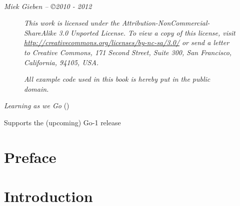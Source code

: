 \documentclass[a4paper,twoside,openleft]{blocksbook}
\begin{document}
\vfill
\begin{center}
    \hspace*{1cm}\\[2.5ex]
    \hspace*{1cm}{\tiny\CcNote{\CcLongnameByNcSa}}
\end{center}
\begin{center}
\hspace*{1cm}\emph{Miek Gieben -- \copyright 2010 - 2012}
\end{center}
\vspace{-3em}

\newpage

\thispagestyle{empty}
\begin{figure}[H]
\begin{center}
\emph{
This work is licensed under the Attribution-NonCommercial-ShareAlike 3.0 Unported License. To
view a copy of this license, visit \url{http://creativecommons.org/licenses/by-nc-sa/3.0/} 
or send a letter
to Creative Commons, 171 Second Street, Suite 300, San Francisco, California, 94105, USA.}
\vspace{2em}

\emph{All example code used in this book is hereby put in the public domain.}
\end{center}
\end{figure}
\begin{center}
\vfill
\emph{Learning as we Go}
(\emph{\version})

\tiny{Supports the (upcoming) Go-1 release}
\vspace{.2\stockheight}
\end{center}

\clearpage

\tableofcontents*
\listoffigures*
\listofcode* 
\listofex* 
\clearpage

\chapter*{Preface}
\label{chap:preface}


\chapter{Introduction}
\label{chap:intro}

\end{document}
